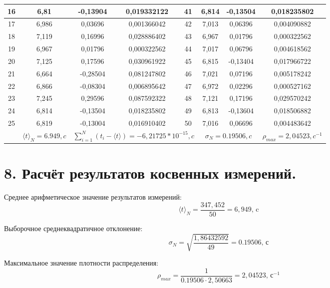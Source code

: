 \documentclass[14pt]{extreport}
\begin{document}
\begin{table}[H]
\begin{tabular}{|c|c|c|c|c|c|c|c|}
        16 & 6,81 & -0,13904 & 0,019332122  & 41 & 6,814 & -0,13504 & 0,018235802  \\ \hline
        17 & 6,986 & 0,03696 & 0,001366042  & 42 & 7,013 & 0,06396 & 0,004090882  \\ \hline
        18 & 7,119 & 0,16996 & 0,028886402  & 43 & 6,967 & 0,01796 & 0,000322562  \\ \hline
        19 & 6,967 & 0,01796 & 0,000322562  & 44 & 7,017 & 0,06796 & 0,004618562  \\ \hline
        20 & 7,125 & 0,17596 & 0,030961922  & 45 & 6,815 & -0,13404 & 0,017966722  \\ \hline
        21 & 6,664 & -0,28504 & 0,081247802  & 46 & 7,021 & 0,07196 & 0,005178242  \\ \hline
        22 & 6,866 & -0,08304 & 0,006895642  & 47 & 6,972 & 0,02296 & 0,000527162  \\ \hline
        23 & 7,245 & 0,29596 & 0,087592322  & 48 & 7,121 & 0,17196 & 0,029570242  \\ \hline
        24 & 6,814 & -0,13504 & 0,018235802  & 49 & 6,813 & -0,13604 & 0,018506882  \\ \hline
        25 & 6,819 & -0,13004 & 0,016910402 & 50 & 7,016 & 0,06696 & 0,004483642 \\ \hline
        & \multicolumn{1}{c|}{$\langle t \rangle_N = 6.949, c$}& \multicolumn{3}{c|}{$\sum\limits_{i=1}^N(t_i - \langle t \rangle) = -6,21725 * 10^{-15}, c$}& \multicolumn{2}{c|}{ $\sigma_N = 0.19506, c$} & $\rho_{max} =   2,04523, c^{-1}$ \\ 
        \hline 
\end{tabular}
\normalsize
\end{table}

\section*{8. Расчёт результатов косвенных измерений.}

Среднее арифметическое значение результатов измерений:
\begin{equation*}
    \langle t \rangle_N = \frac{347,452}{50} = 6,949 \text{, c}
\end{equation*}

Выборочное среднеквадратичное отклонение:
\begin{equation*}
    \sigma_N = \sqrt{\frac{1,86432592}{49}} = 0.19506 \text{, с}
\end{equation*}

Максимальное значение плотности распределения:
\begin{equation*}
    \rho_{max} = \frac{1}{0.19506 \cdot 2,50663} = 2,04523 \text{, с}^{-1}
\end{equation*}
\end{document}
